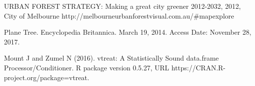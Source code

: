 \begin{bibliography}{}
URBAN FOREST STRATEGY: Making a great city greener 2012-2032, 2012, City of Melbourne http://melbourneurbanforestvisual.com.au/#mapexplore 

Plane Tree. Encyclopedia Britannica. March 19, 2014. Access Date: November 28, 2017.

 Mount J and Zumel N (2016). vtreat: A Statistically Sound data.frame Processor/Conditioner. R package version 0.5.27, URL https://CRAN.R-project.org/package=vtreat. 



\end{bibliography}